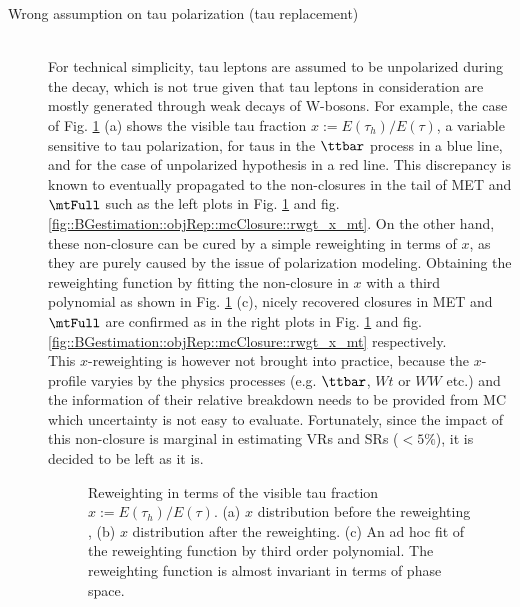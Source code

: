 \begin{description}
\item [Wrong assumption on tau polarization (tau replacement)] \mbox{} \\
For technical simplicity, tau leptons are assumed to be unpolarized during the decay, which is not true given that tau leptons in consideration are mostly generated through weak decays of W-bosons. For example, the case of Fig. \ref{fig::BGestimation::objRep::mcClosure::rwgt_x} (a) shows the visible tau fraction $x := E(\tau_{h})/E(\tau)$, a variable sensitive to tau polarization, for taus in the $\ttbar$ process in a blue line, and for the case of unpolarized hypothesis in a red line. This discrepancy is known to eventually propagated to the non-closures in the tail of MET and $\mtFull$ such as the left plots in Fig. \ref{fig::BGestimation::objRep::mcClosure::rwgt_x} and fig. \ref{fig::BGestimation::objRep::mcClosure::rwgt_x_mt}. On the other hand, these non-closure can be cured by a simple reweighting in terms of $x$, as they are purely caused by the issue of polarization modeling. Obtaining the reweighting function by fitting the non-closure in $x$ with a third polynomial as shown in Fig. \ref{fig::BGestimation::objRep::mcClosure::rwgt_x} (c), nicely recovered closures in MET and $\mtFull$ are confirmed as in the right plots in Fig. \ref{fig::BGestimation::objRep::mcClosure::rwgt_x} and fig. \ref{fig::BGestimation::objRep::mcClosure::rwgt_x_mt} respectively.  \\

This $x$-reweighting is however not brought into practice, because the $x$-profile varyies by the physics processes (e.g. $\ttbar$, $Wt$ or $WW$ etc.) and the information of their relative breakdown needs to be provided from MC which uncertainty is not easy to evaluate.
Fortunately, since the impact of this non-closure is marginal in estimating VRs and SRs ($<5\%$), it is decided to be left as it is.

\begin{figure}[h]
  \centering
    \caption{Reweighting in terms of the visible tau fraction $x := E(\tau_{h})/E(\tau)$. (a) $x$ distribution before the reweighting , (b) $x$ distribution after the reweighting. (c) An ad hoc fit of the reweighting function by third order polynomial. The reweighting function is almost invariant in terms of phase space.  \label{fig::BGestimation::objRep::mcClosure::rwgt_x} }
\end{figure}


\end{description}
